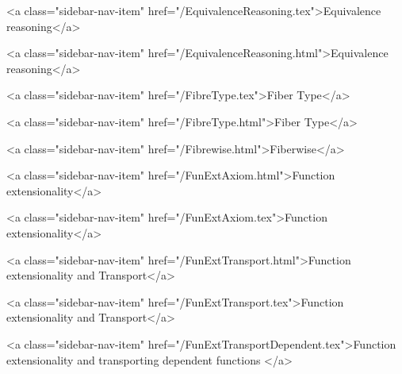       
    
      
        
          <a class="sidebar-nav-item" href="/EquivalenceReasoning.tex">Equivalence reasoning</a>
        
      
    
      
        
          <a class="sidebar-nav-item" href="/EquivalenceReasoning.html">Equivalence reasoning</a>
        
      
    
      
        
          <a class="sidebar-nav-item" href="/FibreType.tex">Fiber Type</a>
        
      
    
      
        
          <a class="sidebar-nav-item" href="/FibreType.html">Fiber Type</a>
        
      
    
      
        
          <a class="sidebar-nav-item" href="/Fibrewise.html">Fiberwise</a>
        
      
    
      
        
          <a class="sidebar-nav-item" href="/FunExtAxiom.html">Function extensionality</a>
        
      
    
      
        
          <a class="sidebar-nav-item" href="/FunExtAxiom.tex">Function extensionality</a>
        
      
    
      
        
          <a class="sidebar-nav-item" href="/FunExtTransport.html">Function extensionality and Transport</a>
        
      
    
      
        
          <a class="sidebar-nav-item" href="/FunExtTransport.tex">Function extensionality and Transport</a>
        
      
    
      
        
          <a class="sidebar-nav-item" href="/FunExtTransportDependent.tex">Function extensionality and transporting dependent functions </a>
        
      
    
      
        
